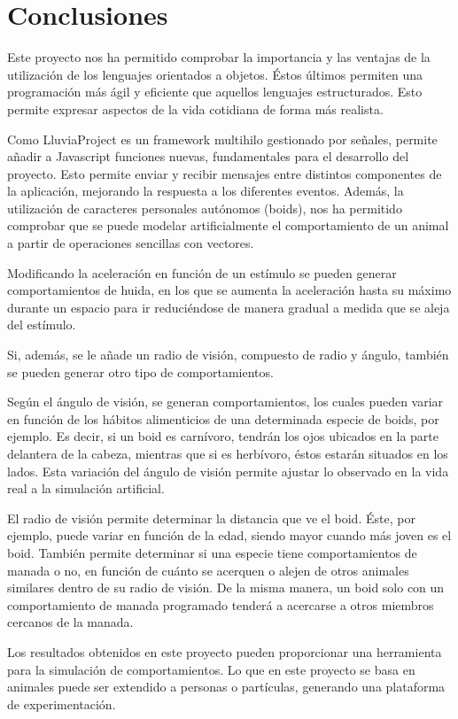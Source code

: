 \section{Conclusiones}
\label{chap:conclusiones}

Este proyecto nos ha permitido comprobar la importancia y las ventajas de la utilización de los lenguajes orientados a objetos. 
Éstos últimos permiten una programación más ágil y eficiente que aquellos lenguajes estructurados. Esto permite expresar aspectos de la vida 
cotidiana de forma más realista.

Como LluviaProject es un framework multihilo gestionado por señales, permite añadir a Javascript funciones nuevas, fundamentales para el desarrollo del proyecto. 
Esto permite enviar y recibir mensajes entre distintos componentes de la aplicación, mejorando la respuesta a los diferentes eventos. Además, la utilización de caracteres 
personales autónomos (boids), nos ha permitido comprobar que se puede modelar artificialmente el comportamiento de un animal a partir de 
operaciones sencillas con vectores.

Modificando la aceleración en función de un estímulo se pueden generar comportamientos de huida, en los que se aumenta la aceleración hasta su 
máximo durante un espacio para ir reduciéndose de manera gradual a medida que se aleja del estímulo.

Si, además, se le añade un radio de visión, compuesto de radio y ángulo, también se pueden generar otro tipo de comportamientos.

Según el ángulo de visión, se generan comportamientos, los cuales pueden variar en función de los hábitos alimenticios de 
una determinada especie de boids, por ejemplo. Es decir, si un boid es carnívoro, tendrán los ojos ubicados en la parte delantera de la cabeza, mientras 
que si es herbívoro, éstos estarán situados en los lados. Esta variación del ángulo de visión permite ajustar lo observado en la vida real a la 
simulación artificial. 

El radio de visión permite determinar la distancia que ve el boid. Éste, por ejemplo, puede variar en función de la edad, siendo mayor cuando
más joven es el boid. También permite determinar si una especie tiene comportamientos de manada o no, en función de cuánto se acerquen o alejen de 
otros animales similares dentro de su radio de visión. De la misma manera, un boid solo con un comportamiento de manada programado tenderá a 
acercarse a otros miembros cercanos de la manada.


Los resultados obtenidos en este proyecto pueden proporcionar una herramienta para la simulación de comportamientos. Lo que en este proyecto 
se basa en animales puede ser extendido a personas o partículas, generando una plataforma de experimentación.